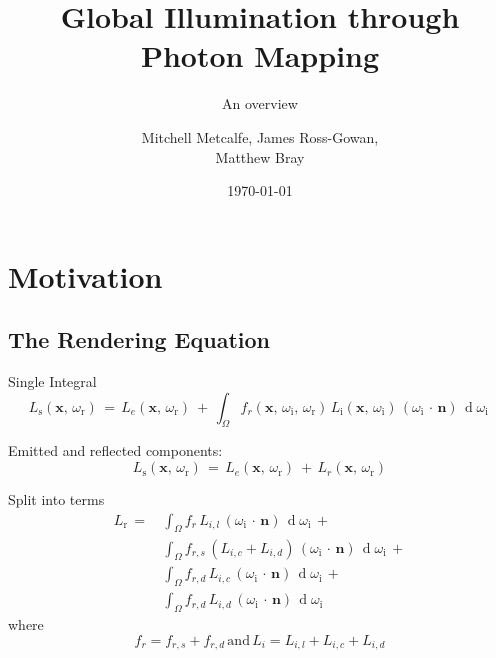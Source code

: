 \documentclass{beamer}
\title[COMP3320 Background Presentation]{Global Illumination through Photon Mapping}
\subtitle{An overview}
\author{Mitchell Metcalfe, James Ross-Gowan,\\ Matthew Bray}
\institute{University of Newcastle}
\date{\today}
\begin{document}
	\maketitle
	
	\section{Motivation}

		\subsection{The Rendering Equation}

			\begin{frame}{Single Integral}
				\[
					L_{\text{s}}(\mathbf x,\, \omega_{\text{r}}) \,=\,%
						L_e(\mathbf x,\, \omega_{\text{r}}) \ +\, %
						\int_\Omega %
							f_r(\mathbf x,\, \omega_{\text{i}},\, \omega_{\text{r}})\, %
								L_{\text{i}}(\mathbf x,\, \omega_{\text{i}})\, %
							(\omega_{\text{i}}\,\cdot\,\mathbf n)\,
						\operatorname d \omega_{\text{i}}
				\, \]

				\pause
				Emitted and reflected components:
				\[
					L_{\text{s}}(\mathbf x,\, \omega_{\text{r}}) \,=\,%
						L_e(\mathbf x,\, \omega_{\text{r}}) \ +\, %
						L_r(\mathbf x,\, \omega_{\text{r}})
				\]
			\end{frame}

			\begin{frame}{Split into terms}
				\begin{equation*}
				\begin{split}
					L_{\text{r}} \,=\,%
						&\int_\Omega %
							f_r\, %
								L_{i,l}\, %
							(\omega_{\text{i}}\,\cdot\,\mathbf n)\,
						\operatorname d \omega_{\text{i}}%
						\, +\\%
						&\int_\Omega %
							f_{r, s}\, %
								(L_{i,c} + L_{i,d})\, %
							(\omega_{\text{i}}\,\cdot\,\mathbf n)\,
						\operatorname d \omega_{\text{i}}
						\, +\\%
						&\int_\Omega %
							f_{r, d}\, %
								L_{i,c}\, %
							(\omega_{\text{i}}\,\cdot\,\mathbf n)\,
						\operatorname d \omega_{\text{i}}
						\, +\\%
						&\int_\Omega %
							f_{r, d}\, %
								L_{i,d}\, %
							(\omega_{\text{i}}\,\cdot\,\mathbf n)\,
						\operatorname d \omega_{\text{i}}
				\, \end{split}
				\end{equation*}
				where
				\[
					f_r = f_{r, s} + f_{r, d}%
					\, \text{and} \,%
					L_i = L_{i,l} + L_{i,c} + L_{i,d}
				\]
			\end{frame}
\end{document}
